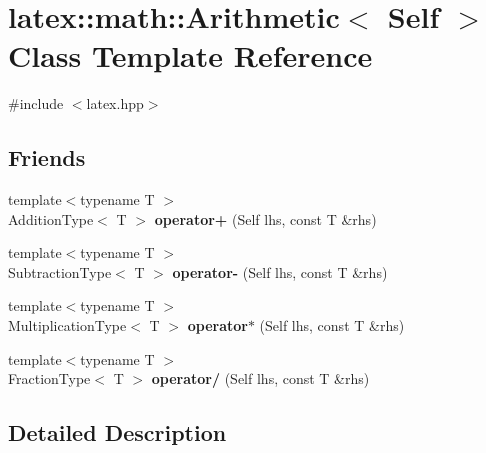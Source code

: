 \hypertarget{classlatex_1_1math_1_1Arithmetic}{\section{latex\-:\-:math\-:\-:\-Arithmetic$<$ \-Self $>$ \-Class \-Template \-Reference}
\label{classlatex_1_1math_1_1Arithmetic}
}


{\ttfamily \#include $<$latex.\-hpp$>$}

\subsection*{\-Friends}
\begin{DoxyCompactItemize}
\item 
\hypertarget{classlatex_1_1math_1_1Arithmetic_a155d480ff9b7bc80905693bf242bb33c}{{\footnotesize template$<$typename T $>$ }\\\-Addition\-Type$<$ \-T $>$ {\bfseries operator+} (\-Self lhs, const \-T \&rhs)}\label{classlatex_1_1math_1_1Arithmetic_a155d480ff9b7bc80905693bf242bb33c}

\item 
\hypertarget{classlatex_1_1math_1_1Arithmetic_a24cab9ec4a616c0867cff93fc12cebb9}{{\footnotesize template$<$typename T $>$ }\\\-Subtraction\-Type$<$ \-T $>$ {\bfseries operator-\/} (\-Self lhs, const \-T \&rhs)}\label{classlatex_1_1math_1_1Arithmetic_a24cab9ec4a616c0867cff93fc12cebb9}

\item 
\hypertarget{classlatex_1_1math_1_1Arithmetic_aa267f966985c6d88035fa9303a4596e4}{{\footnotesize template$<$typename T $>$ }\\\-Multiplication\-Type$<$ \-T $>$ {\bfseries operator$\ast$} (\-Self lhs, const \-T \&rhs)}\label{classlatex_1_1math_1_1Arithmetic_aa267f966985c6d88035fa9303a4596e4}

\item 
\hypertarget{classlatex_1_1math_1_1Arithmetic_af38965342bb2cef83ee88be612d03b63}{{\footnotesize template$<$typename T $>$ }\\\-Fraction\-Type$<$ \-T $>$ {\bfseries operator/} (\-Self lhs, const \-T \&rhs)}\label{classlatex_1_1math_1_1Arithmetic_af38965342bb2cef83ee88be612d03b63}

\end{DoxyCompactItemize}


\subsection{\-Detailed \-Description}
